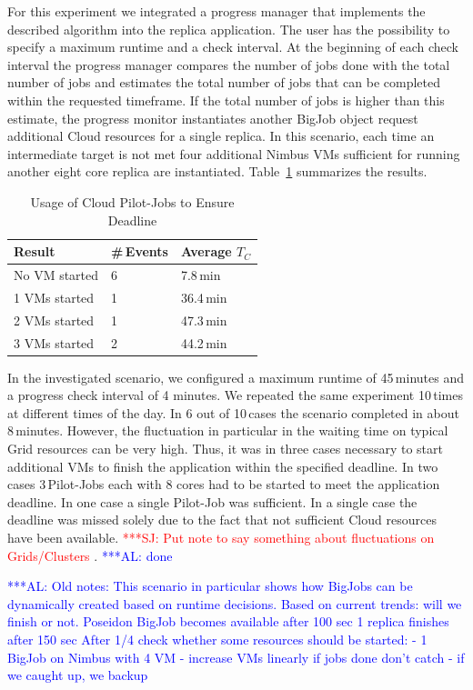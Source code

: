 \documentclass[conference,final]{IEEEtran}
\newcommand{\tc}{$T_{C}$ }
\newcommand{\alnote}[1]{ {\textcolor{blue} { ***AL: #1 }}}
\newcommand{\jhanote}[1]{ {\textcolor{red} { ***SJ: #1 }}}
\newcommand{\alnote}[1]{}
\newcommand{\jhanote}[1]{}
\begin{document}
For this experiment we integrated a progress manager that implements
the described algorithm into the replica application.  The user has
the possibility to specify a maximum runtime and a check interval.  At
the beginning of each check interval the progress manager compares the
number of jobs done with the total number of jobs and estimates the
total number of jobs that can be completed within the requested
timeframe. If the total number of jobs is higher than this estimate,
the progress monitor instantiates another BigJob object request
additional Cloud resources for a single replica.  In this scenario,
each time an intermediate target is not met four additional Nimbus VMs
sufficient for running another eight core replica are instantiated.
Table~\ref{tab:app_deadline} summarizes the results.

\begin{table}[ht]
    \centering
	\begin{tabular}{|l|l|l|}
	\hline
    Result & \#\,Events &Average \tc \\ \hline
	No VM started &6 &7.8\,min\\ \hline
	1 VMs started &1 &36.4\,min\\ \hline
	2 VMs started &1 &47.3\,min\\ \hline
	3 VMs started &2 &44.2\,min\\ \hline
	\end{tabular}
	\caption{Usage of Cloud Pilot-Jobs to Ensure Deadline \label{tab:app_deadline}}
\end{table}

In the investigated scenario, we configured a maximum runtime of
45\,minutes and a progress check interval of 4 minutes. We repeated
the same experiment 10\,times at different times of the day. In 6 out
of 10\,cases the scenario completed in about 8\,minutes. However, the
fluctuation in particular in the waiting time on typical Grid
resources can be very high. Thus, it was in three cases necessary to
start additional VMs to finish the application within the specified
deadline. In two cases 3\,Pilot-Jobs each with 8 cores had to be
started to meet the application deadline. In one case a single
Pilot-Job was sufficient. In a single case the deadline was missed
solely due to the fact that not sufficient Cloud resources have been
available. \jhanote{Put note to say something about fluctuations on
  Grids/Clusters}. \alnote{done}

\alnote{Old notes: This scenario in particular shows how BigJobs can
  be dynamically created based on runtime decisions.  Based on current
  trends: will we finish or not.  Poseidon BigJob becomes available
  after 100 sec 1 replica finishes after 150 sec After 1/4 check
  whether some resources should be started: - 1 BigJob on Nimbus with
  4 VM - increase VMs linearly if jobs done don't catch - if we caught
  up, we backup}
\end{document}
